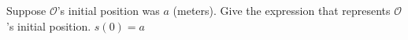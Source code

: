 {Suppose $\mathcal{O}$'s initial position was $a$ (meters).  Give the expression that represents $\mathcal{O}$'s initial position.}
{$s(0)=a$}